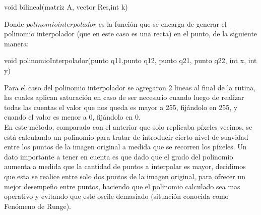 \begin{algorithm}
\begin{algorithmic}[H]\parskip=1mm
\caption{void bilineal(matriz A, vector Res,int k)}
\end{algorithmic}
\end{algorithm}
Donde $polinomio interpolador$ es la función que se encarga de generar el polinomio interpolador (que en este caso es una recta) en el punto, de la siguiente manera:
\begin{algorithm}
\begin{algorithmic}[H]\parskip=1mm
\caption{void polinomioInterpolador(punto q11,punto q12, punto q21, punto q22, int x, int y)}
\end{algorithmic}
\end{algorithm}
Para el caso del polinomio interpolador se agregaron 2 lineas al final de la rutina, las cuales aplican saturación en caso de ser necesario cuando luego de realizar todas las cuentas el valor que nos queda es mayor a 255, fijándolo en 255, y cuando el valor es menor a 0, fijándolo en 0.
\\
En este método, comparado con el anterior que solo replicaba píxeles vecinos, se está calculando un polinomio para tratar de introducir cierto nivel de suavidad entre los puntos de la imagen original a medida que se recorren los píxeles. Un dato importante a tener en cuenta es que dado que el grado del polinomio aumenta a medida que la cantidad de puntos a interpolar es mayor, decidimos que esta se realice entre solo dos puntos de la imagen original, para ofrecer un mejor desempeño entre puntos, haciendo que el polinomio calculado sea mas operativo y evitando que este oscile demasiado (situación conocida como Fenómeno de Runge). 
